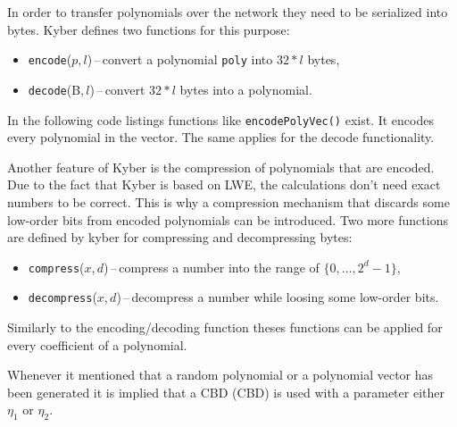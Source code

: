 In order to transfer polynomials over the network they need to be serialized into bytes. Kyber defines two functions for this purpose:
\begin{itemize}
  \item \texttt{encode}($p$,\,$l$)\,--\,convert a polynomial \texttt{poly} into $32*l$ bytes,
  \item \texttt{decode}(B,\,$l$)\,--\,convert $32*l$ bytes into a polynomial.
\end{itemize}
In the following code listings functions like \texttt{encodePolyVec()} exist. It encodes every polynomial in the vector. The same applies for the decode functionality.

Another feature of Kyber is the compression of polynomials that are encoded. Due to the fact that Kyber is based on LWE, the calculations don't need exact numbers to be correct. This is why a compression mechanism that discards some low-order bits from encoded polynomials can be introduced. Two more functions are defined by kyber for compressing and decompressing bytes:
\begin{itemize}
  \item \texttt{compress}($x$,\,$d$)\,--\,compress a number into the range of $\{0,\dots,2^d-1\}$,
  \item \texttt{decompress}($x$,\,$d$)\,--\,decompress a number while loosing some low-order bits.
\end{itemize}
Similarly to the encoding/decoding function theses functions can be applied for every coefficient of a polynomial.

Whenever it mentioned that a random polynomial or a polynomial vector has been generated it is implied that a CBD (\acl{CBD}) is used with a parameter either $\eta_1$ or $\eta_2$.